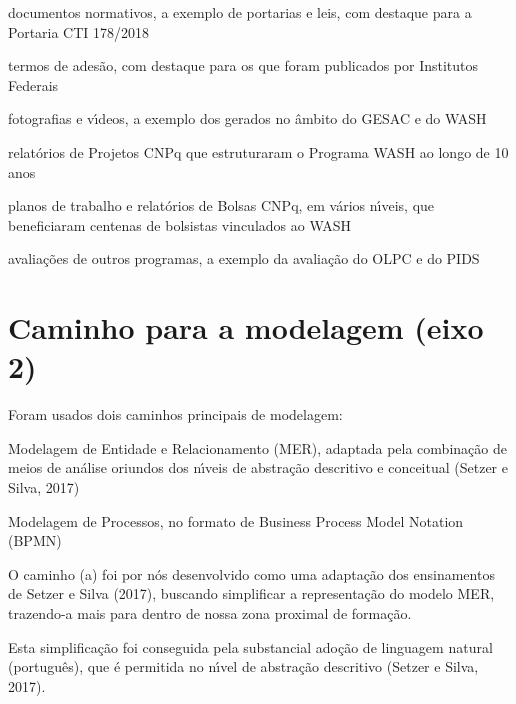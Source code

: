 \documentclass[
12pt,		%
openright,	%
twoside,  %
a4paper,			%
chapter=TITLE,		%
english,			%
french,				%
spanish,			%
brazil				%
]{USPSC-classe/USPSC}
\begin{document}
\begin{alineas}
\item documentos normativos, a exemplo de portarias e leis, com destaque para a Portaria CTI 178/2018
\item termos de ades\~ao, com destaque para os que foram publicados por Institutos Federais
\item fotografias e v\'{\i}deos, a exemplo dos gerados no \^ambito do GESAC e do WASH
\item relat\'orios de Projetos CNPq que estruturaram o Programa WASH ao longo de 10 anos
\item planos de trabalho e relat\'orios de Bolsas CNPq, em v\'arios n\'{\i}veis, que beneficiaram centenas de bolsistas vinculados ao WASH
\item avalia\c{c}\~oes de outros programas, a exemplo da avalia\c{c}\~ao do OLPC e do PIDS
\end{alineas}

\section[Caminho para a modelagem (eixo 2)]{Caminho para a modelagem (eixo 2)}\label{Caminho para a modelagem (eixo 2)}
Foram usados dois caminhos principais de modelagem:










\begin{alineas}
\item Modelagem de Entidade e Relacionamento (MER), adaptada pela combina\c{c}\~ao de meios de an\'alise oriundos dos n\'{\i}veis de abstra\c{c}\~ao descritivo e conceitual (Setzer e Silva, 2017)
\item Modelagem de Processos, no formato de Business Process Model Notation (BPMN)
\end{alineas}

O caminho (a) foi por n\'os desenvolvido como uma adapta\c{c}\~ao dos ensinamentos de  Setzer e Silva (2017), buscando simplificar a representa\c{c}\~ao do modelo MER, trazendo-a mais para dentro de nossa zona proximal de forma\c{c}\~ao.









Esta simplifica\c{c}\~ao foi conseguida pela substancial ado\c{c}\~ao de linguagem natural (portugu\^es), que \'e permitida no n\'{\i}vel de abstra\c{c}\~ao descritivo (Setzer e Silva, 2017).
\end{document}
